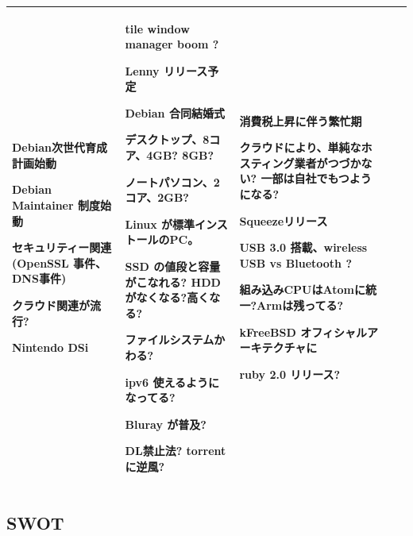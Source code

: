 \documentclass[mingoth,a4paper]{jsarticle}
\begin{document}
{\begin{tabular}[t]{|p{8em}|p{8em}|p{12em}|p{8em}|p{8em}|}
Debian次世代育成計画始動

Debian Maintainer 制度始動

セキュリティー関連(OpenSSL 事件、DNS事件)

クラウド関連が流行?

Nintendo DSi

&

tile window manager boom ?

Lenny リリース予定

Debian 合同結婚式

デスクトップ、8コア、4GB? 8GB?

ノートパソコン、2コア、2GB?

Linux が標準インストールのPC。

SSD の値段と容量がこなれる?
HDDがなくなる?高くなる?

ファイルシステムかわる?

ipv6 使えるようになってる?

Bluray が普及?

DL禁止法? torrent に逆風?

&

消費税上昇に伴う繁忙期

クラウドにより、単純なホスティング業者がつづかない?
一部は自社でもつようになる?

Squeezeリリース

USB 3.0 搭載、wireless USB vs Bluetooth ?

組み込みCPUはAtomに統一?Armは残ってる?

kFreeBSD オフィシャルアーキテクチャに

ruby 2.0 リリース?

 \\

\hline
\end{tabular}

}

\subsection{SWOT}
\end{document}
